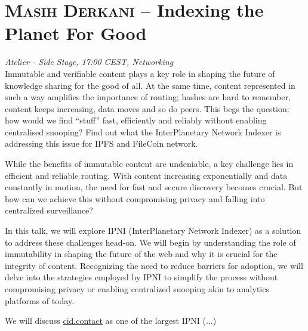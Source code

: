 \section {\textsc{Masih Derkani} -- Indexing the Planet For Good
} \noindent \textit {Atelier - Side Stage, 17:00 CEST, Networking
}\\[1em] Immutable and verifiable content plays a key role in shaping the future of knowledge sharing for the good of all. At the same time, content represented in such a way amplifies the importance of routing; hashes are hard to remember, content keeps increasing, data moves and so do peers. This begs the question: how would we find ``stuff'' fast, efficiently and reliably without enabling centralised snooping? Find out what the InterPlanetary Network Indexer is addressing this issue for IPFS and FileCoin network.
\par While the benefits of immutable content are undeniable, a key challenge lies in efficient and reliable routing. With content increasing exponentially and data constantly in motion, the need for fast and secure discovery becomes crucial. But how can we achieve this without compromising privacy and falling into centralized surveillance?

In this talk, we will explore IPNI (InterPlanetary Network Indexer) as a solution to address these challenges head-on. We will begin by understanding the role of immutability in shaping the future of the web and why it is crucial for the integrity of content. Recognizing the need to reduce barriers for adoption, we will delve into the strategies employed by IPNI to simplify the process without compromising privacy or enabling centralized snooping akin to analytics platforms of today.

We will discuss \href{http://cid.contact}{cid.contact}
 as one of the largest IPNI
(...)\clearpage
